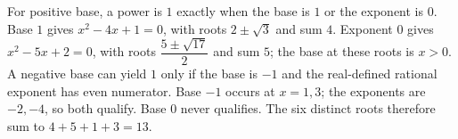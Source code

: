 For positive base, a power is $1$ exactly when the base is $1$ or the exponent is $0$. Base $1$ gives $x^2-4x+1=0$, with roots $2\pm\sqrt 3$ and sum $4$. Exponent $0$ gives $x^2-5x+2=0$, with roots $\dfrac{5\pm\sqrt{17}}{2}$ and sum $5$; the base at these roots is $x>0$. A negative base can yield $1$ only if the base is $-1$ and the real-defined rational exponent has even numerator. Base $-1$ occurs at $x=1,3$; the exponents are $-2,-4$, so both qualify. Base $0$ never qualifies. The six distinct roots therefore sum to $4+5+1+3=\boxed{13}$.
